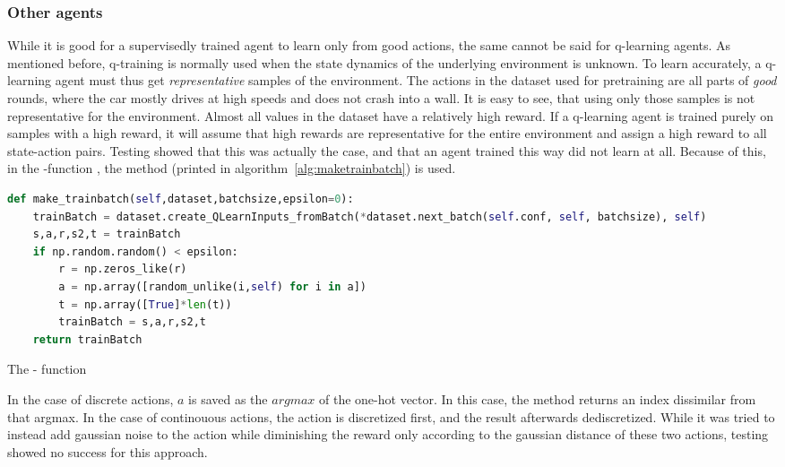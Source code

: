 \subsubsection{Other agents}

While it is good for a supervisedly trained agent to learn only from good actions, the same cannot be said for q-learning agents. As mentioned before, q-training is normally used when the state dynamics of the underlying environment is unknown. To learn accurately, a q-learning agent must thus get \textit{representative} samples of the environment. The actions in the dataset used for pretraining are all parts of \textit{good} rounds, where the car mostly drives at high speeds and does not crash into a wall. It is easy to see, that using only those samples is not representative for the environment. Almost all values in the dataset have a relatively high reward. If a q-learning agent is trained purely on samples with a high reward, it will assume that high rewards are representative for the entire environment and assign a high reward to all state-action pairs. Testing showed that this was actually the case, and that an agent trained this way did not learn at all. Because of this, in the -function , the method  (printed in algorithm~\ref{alg:maketrainbatch}) is used.

\begin{algorithm}[h]
\begin{lstlisting}[language=Python, style=Python, frame=none]
def make_trainbatch(self,dataset,batchsize,epsilon=0):
	trainBatch = dataset.create_QLearnInputs_fromBatch(*dataset.next_batch(self.conf, self, batchsize), self)
	s,a,r,s2,t = trainBatch
	if np.random.random() < epsilon:
		r = np.zeros_like(r)
		a = np.array([random_unlike(i,self) for i in a])
		t = np.array([True]*len(t))
		trainBatch = s,a,r,s2,t
	return trainBatch
\end{lstlisting}%
\caption{The  - function}
\label{alg:maketrainbatch}
\end{algorithm}

In the case of discrete actions, $a$ is saved as the $argmax$ of the one-hot vector. In this case, the method  returns an index dissimilar from that argmax. In the case of continouous actions, the action is discretized first, and the result afterwards dediscretized. While it was tried to instead add gaussian noise to the action while diminishing the reward only according to the gaussian distance of these two actions, testing showed no success for this approach.

